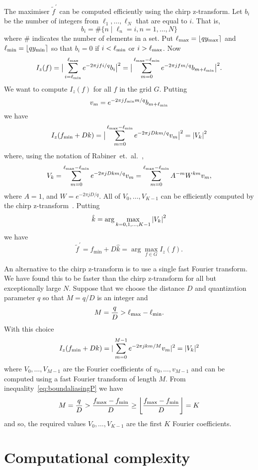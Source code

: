 \documentclass[10pt,twocolumn,twoside]{IEEEtran}
\begin{document}
The maximiser $\widetilde{f}^\prime$ can be computed efficiently using the chirp z-transform.  Let $b_i$ be the number of integers from $\ell_1,\dots,\ell_N$ that are equal to $i$.  That is,
\[
b_i= \#\{ n \mid \ell_n = i, n = 1,\dots, N\}
\]
where $\#$ indicates the number of elements in a set.  Put $\ell_{\text{max}} = {\left\lfloor q y_{\text{max}} \right\rceil}$ and $\ell_{\text{min}} = {\left\lfloor q y_{\text{min}} \right\rceil}$ so that $b_i = 0$ if $i < \ell_{\text{min}}$ or $i > \ell_{\text{max}}$.  Now
\[
I_z(f) = \big\vert  \sum_{i = \ell_{\text{min}}}^{\ell_{\text{max}}} e^{ -2\pi j f i/q} b_i  \big\vert^2 = \big\vert  \sum_{m = 0}^{\ell_{\text{max}}-\ell_{\text{min}}} e^{ -2\pi j f m/q} b_{m+\ell_{\text{min}}}  \big\vert^2.
\]
We want to compute $I_z(f)$ for all $f$ in the grid $G$.  Putting
\[
v_m = e^{ -2\pi j f_{\text{min}}m/q} b_{m+\ell_{\text{min}}}
\]
we have
\[
I_z(f_{\text{min}} + Dk) = \big\vert  \sum_{m = 0}^{\ell_{\text{max}}-\ell_{\text{min}}} e^{ -2\pi j Dk m/q} v_m  \big\vert^2 = \left\vert V_k \right\vert^2
\]   
where, using the notation of Rabiner~et.~al.~\cite[eq.~(10)]{Rabiner1969},
\[
V_k = \sum_{m = 0}^{\ell_{\text{max}}-\ell_{\text{min}}} e^{ -2\pi j Dk m/q} v_m = \sum_{m=0}^{\ell_{\text{max}}-\ell_{\text{min}}} A^{-m} W^{km} v_m,
\]
where $A = 1$, and $W = e^{ -2\pi j D/q}$.  All of $V_0,\dots,V_{K-1}$ can be efficiently computed by the chirp z-transform~\cite{Rabiner1969}.  Putting
\[
\hat{k} = \arg\max_{k = 0,1,\dots,K-1} \left\vert  V_k  \right\vert^2
\]
we have
\[ 
\widetilde{f}^\prime = f_{\text{min}} + D\hat{k} = \arg\max_{f \in G} I_z(f).
\]

An alternative to the chirp z-transform is to use a single fast Fourier transform.  We have found this to be faster than the chirp z-transform for all but exceptionally large $N$.  Suppose that we choose the distance $D$ and quantization parameter $q$ so that $M = q/D$ is an integer and
\[
M = \frac{q}{D} > \ell_{\text{max}}-\ell_{\text{min}}.
\]
With this choice
\[
I_z(f_{\text{min}} + Dk) = \vert \sum_{m = 0}^{M-1} e^{-2\pi j k m/M} v_m \vert^2 = \vert V_k \vert^2
\]
where $V_0,\dots,V_{M-1}$ are the Fourier coefficients of $v_0,\dots,v_{M-1}$ and can be computed using a fast Fourier transform of length $M$.  From inequality~\eqref{eq:boundaliasingP} we have
\[
M = \frac{q}{D} > \frac{f_{\text{max}} - f_{\text{min}}}{D} \geq {\left\lfloor \frac{f_{\text{max}} - f_{\text{min}}}{D} \right\rfloor} = K
\]
and so, the required values  $V_0,\dots,V_{K-1}$ are the first $K$ Fourier coefficients.


\section{Computational complexity}\label{sec:comp-compl}
\end{document}
